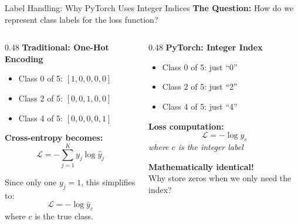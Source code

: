 \documentclass[xcolor=svgnames, 8pt, handout, standalone]{beamer}
\newcommand{\1}{\mathbf{1}}
\begin{document}
\begin{frame}{Label Handling: Why PyTorch Uses Integer Indices}
\textbf{The Question:} How do we represent class labels for the loss function?

\vspace{0.5em}
\begin{columns}
\begin{column}{0.48\textwidth}
\textbf{Traditional: One-Hot Encoding}
\begin{itemize}
\item Class 0 of 5: $[1,0,0,0,0]$
\item Class 2 of 5: $[0,0,1,0,0]$
\item Class 4 of 5: $[0,0,0,0,1]$
\end{itemize}

\vspace{0.3em}
\textbf{Cross-entropy becomes:}
$$\mathcal{L} = -\sum_{j=1}^K y_j \log \hat{y}_j$$

\vspace{0.3em}
Since only one $y_j = 1$, this simplifies to:
$$\mathcal{L} = -\log \hat{y}_c$$
where $c$ is the true class.
\end{column}
\begin{column}{0.48\textwidth}
\textbf{PyTorch: Integer Index}
\begin{itemize}
\item Class 0 of 5: just ``0''
\item Class 2 of 5: just ``2''
\item Class 4 of 5: just ``4''
\end{itemize}

\vspace{0.3em}
\textbf{Loss computation:}
$$\mathcal{L} = -\log \hat{y}_c$$
\textit{where $c$ is the integer label}

\vspace{0.3em}
\textbf{Mathematically identical!}\\
Why store zeros when we only need the index?
\end{column}
\end{columns}
\end{frame}
\end{document}
